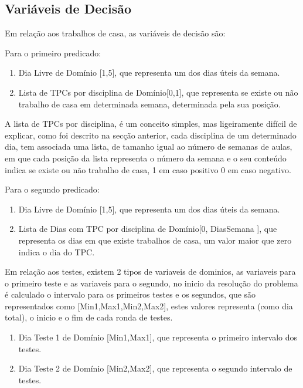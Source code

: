 \documentclass{llncs}
\begin{document}
\subsection{Variáveis de Decisão}

Em relação aos trabalhos de casa, as variáveis de decisão são:

Para o primeiro predicado:
\begin{enumerate}
\item Dia Livre de Domínio [1,5], que representa um dos dias úteis da semana.
\item Lista de TPCs por disciplina de Domínio[0,1], que representa se existe ou não trabalho de casa em determinada semana, determinada pela sua posição.
\end{enumerate}

A lista de TPCs por disciplina, é um conceito simples, mas ligeiramente difícil de explicar, como foi descrito na secção anterior, cada disciplina de um determinado dia, tem associada uma lista, de tamanho igual ao número de semanas de aulas, em que cada posição da lista representa o número da semana e o seu conteúdo indica se existe ou não trabalho de casa, 1 em caso positivo 0 em caso negativo.

Para o segundo predicado:
\begin{enumerate}
\item Dia Livre de Domínio [1,5], que representa um dos dias úteis da semana.
\item Lista de Dias com TPC por disciplina de Domínio[0, DiasSemana ], que representa os dias em que existe trabalhos de casa, um valor maior que zero indica o dia do TPC.
\end{enumerate}

%
Em relação aos testes, existem 2 tipos de variaveis de dominios, as variaveis para o primeiro teste e as variaveis para o segundo, no inicio da resolução do problema é calculado o intervalo para os primeiros testes e os segundos, que são representados como [Min1,Max1,Min2,Max2], estes valores representa (como dia total), o inicio e o fim de cada ronda de testes.

\begin{enumerate}
\item Dia Teste 1 de Domínio [Min1,Max1], que representa o primeiro intervalo dos testes.
\item Dia Teste 2 de Domínio [Min2,Max2], que representa o segundo intervalo de testes.
\end{enumerate}
\end{document}
